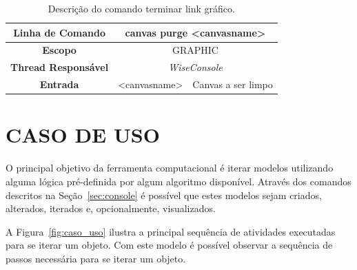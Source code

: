 \begin{center}
	\begin{table}[!htbp]
		\begin{tabularx}{\textwidth}{c|c|X}
			\toprule
			\textbf{Linha de Comando} & \multicolumn{2}{c}{canvas purge <canvas\underline{\space\space}name>} \\
			\midrule
			\textbf{Escopo} & \multicolumn{2}{c}{GRAPHIC} \\
			\hline
			\textbf{Thread Responsável} & \multicolumn{2}{c}{\textit{WiseConsole}} \\
			\hline
			\textbf{Entrada} & <canvas\underline{\space\space}name> & Canvas a ser limpo \\
			\bottomrule
		\end{tabularx}
		\caption{Descrição do comando terminar link gráfico.}
		\label{tab:graphic_purge}
	\end{table}
\end{center}

\section{CASO DE USO}\label{sec:caso_de_uso}

O principal objetivo da ferramenta computacional é iterar modelos utilizando alguma lógica pré-definida por algum algoritmo disponível. Através dos comandos descritos na Seção~\ref{sec:console} é possível que estes modelos sejam criados, alterados, iterados e, opcionalmente, visualizados.

A Figura~\ref{fig:caso_uso} ilustra a principal sequência de atividades executadas para se iterar um objeto. Com este modelo é possível observar a sequência de passos necessária para se iterar um objeto.

